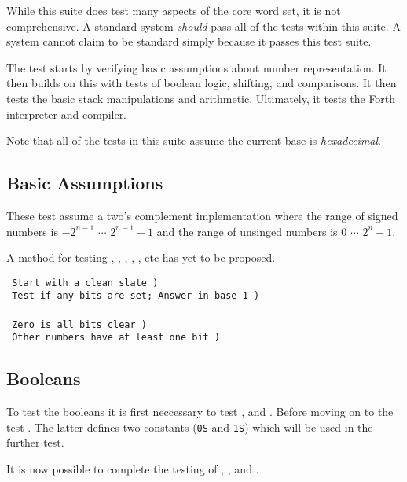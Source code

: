 While this suite does test many aspects of the core word set, it is
not comprehensive.  A standard system \emph{should} pass all of the
tests within this suite.  A system cannot claim to be standard simply
because it passes this test suite.

The test starts by verifying basic assumptions about number
representation.  It then builds on this with tests of boolean logic,
shifting, and comparisons.  It then tests the basic stack manipulations
and arithmetic.  Ultimately, it tests the Forth interpreter and
compiler.

Note that all of the tests in this suite assume the current base is
\emph{hexadecimal}.

\subsection{Basic Assumptions}

These test assume a two's complement implementation where the range of
signed numbers is $-2^{n-1}$ $\cdots$ $2^{n-1}-1$ and the range of
unsinged numbers is $0$ $\cdots$ $2^n-1$.

A method for testing , , ,
, , etc has yet to be proposed.

\test{}{} \tab[10] \texttt{ Start with a clean slate )} \\
\texttt{ Test if any bits are set; Answer in base 1 )} \\
 \\
	\tab[2.8] \texttt{ Zero is all bits clear )} \\
	\tab[1.6] \texttt{ Other numbers have at least one bit )} \\

\subsection{Booleans}

To test the booleans it is first neccessary to test
, and .  Before moving
on to the test .  The latter defines
two constants (\texttt{0S} and \texttt{1S}) which will be used in the
further test.

It is now possible to complete the testing of
	,
	, and
	.

